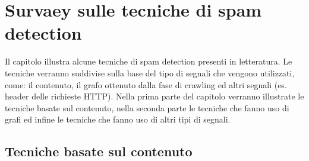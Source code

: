 \chapter{Survaey sulle tecniche di spam detection}

Il capitolo illustra alcune tecniche di spam detection presenti in letteratura. Le tecniche verranno suddivise sulla base del tipo di segnali che vengono utilizzati, come: il contenuto, il grafo ottenuto dalla fase di crawling ed altri segnali (es. header delle richieste HTTP). Nella prima parte del capitolo verranno illustrate le tecniche basate sul contenuto, nella seconda parte le tecniche che fanno uso di grafi ed infine le tecniche che fanno uso di altri tipi di segnali.

\section{Tecniche basate sul contenuto}
